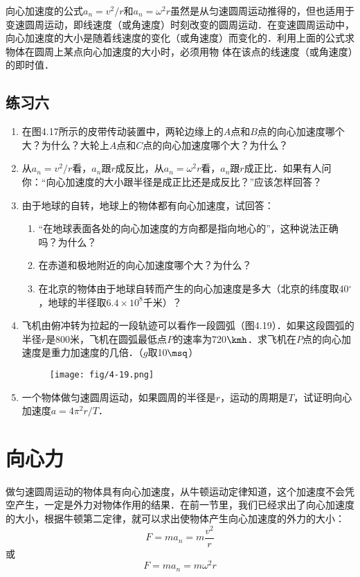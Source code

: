 向心加速度的公式$a_n=v^2/r$和$a_n=\omega^2 r$虽然是从匀速圆周运动推得的，但也适用于变速圆周运动，即线速度（或角速度）时刻改变的圆周运动．在变速圆周运动中，向心加速度的大小是随着线速度的变化（或角速度）而变化的．利用上面的公式求物体在圆周上某点向心加速度的大小时，必须用物
体在该点的线速度（或角速度）的即时值．

\subsection*{练习六}
\begin{enumerate}
	\item 在图4.17所示的皮带传动装置中，两轮边缘上的$A$点和$B$点的向心加速度哪个大？为什么？大轮上$A$点和$C$点的向心加速度哪个大？为什么？
	\item 从$a_n=v^2/r$看，$a_n$跟$r$成反比，从$a_n=\omega^2r$看，$a_n$跟$r$成正比．如果有人问你：“向心加速度的大小跟半径是成正比还是成反比？”应该怎样回答？
	\item 由于地球的自转，地球上的物体都有向心加速度，试回答：
\begin{enumerate}
	\item “在地球表面各处的向心加速度的方向都是指向地心的”，这种说法正确吗？为什么？
	\item 在赤道和极地附近的向心加速度哪个大？为什么？
	\item 在北京的物体由于地球自转而产生的向心加速度是多大（北京的纬度取40$^\circ$，地球的半径取$6.4\times 10^8$千米）？	
\end{enumerate}
\item	 飞机由俯冲转为拉起的一段轨迹可以看作一段圆弧（图4.19）．如果这段圆弧的半径$r$是800米，飞机在圆弧最低点$P$的速率为720$\kmh$．求飞机在$P$点的向心加速度是重力加速度的几倍．（$g$取10$\msq$）
\begin{figure}[htp]
\centering\texttt{[image: fig/4-19.png]}
\caption{}
\end{figure}

	\item 一个物体做匀速圆周运动，如果圆周的半径是$r$，运动的周期是$T$，试证明向心加速度$a=4\pi^2r/T$．
\end{enumerate}

\section{向心力}
做匀速圆周运动的物体具有向心加速度，从牛顿运动定律知道，这个加速度不会凭空产生，一定是外力对物体作用的结果．在前一节里，我们已经求出了向心加速度的大小，根据牛顿第二定律，就可以求出使物体产生向心加速度的外力的大小：
\[F=ma_n=m\frac{v^2}{r} \]
或
\[F=ma_n=m\omega^2 r \]

